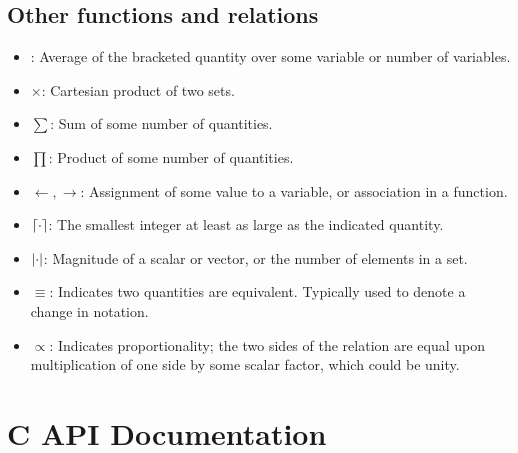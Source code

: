 \begin{appendix}
\section{Other functions and relations}
\begin{itemize}
\item \angles{\cdot}: Average of the bracketed quantity over some variable or number of variables.
\item $\times$: Cartesian product of two sets.
\item $\sum$: Sum of some number of quantities.
\item $\prod$: Product of some number of quantities.
\item $\leftarrow,\rightarrow$: Assignment of some value to a variable, or association in a function.
\item $\left\lceil \cdot\right\rceil$: The smallest integer at least as large as the indicated quantity.
\item $\left|\cdot\right|$: Magnitude of a scalar or vector, or the number of elements in a set.
\item $\equiv$: Indicates two quantities are equivalent. Typically used to denote a change in notation.
\item $\propto$: Indicates proportionality; the two sides of the relation are equal upon multiplication of one side by some scalar factor, which could be unity.
\end{itemize}

\chapter{C API Documentation}

\end{appendix}